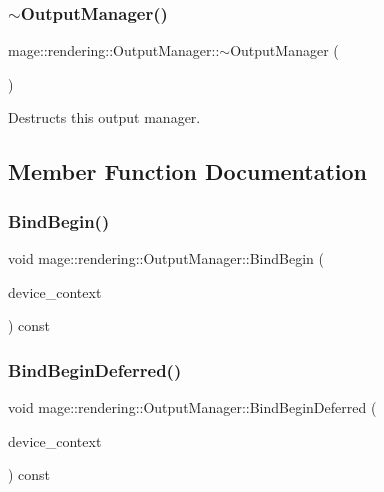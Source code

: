 \subsubsection{\texorpdfstring{$\sim$\+Output\+Manager()}{~OutputManager()}}
{\footnotesize\ttfamily mage\+::rendering\+::\+Output\+Manager\+::$\sim$\+Output\+Manager (\begin{DoxyParamCaption}{ }\end{DoxyParamCaption})\hspace{0.3cm}{\ttfamily [default]}}

Destructs this output manager. 

\subsection{Member Function Documentation}
\hypertarget{classmage_1_1rendering_1_1_output_manager_a9c753354655b7b218263832c343417d1}{}\label{classmage_1_1rendering_1_1_output_manager_a9c753354655b7b218263832c343417d1} 
\subsubsection{\texorpdfstring{Bind\+Begin()}{BindBegin()}}
{\footnotesize\ttfamily void mage\+::rendering\+::\+Output\+Manager\+::\+Bind\+Begin (\begin{DoxyParamCaption}\item[{I\+D3\+D11\+Device\+Context \&}]{device\+\_\+context }\end{DoxyParamCaption}) const\hspace{0.3cm}{\ttfamily [noexcept]}}

\hypertarget{classmage_1_1rendering_1_1_output_manager_ad05f55888d2075806ae7a381031ecdfd}{}\label{classmage_1_1rendering_1_1_output_manager_ad05f55888d2075806ae7a381031ecdfd} 
\subsubsection{\texorpdfstring{Bind\+Begin\+Deferred()}{BindBeginDeferred()}}
{\footnotesize\ttfamily void mage\+::rendering\+::\+Output\+Manager\+::\+Bind\+Begin\+Deferred (\begin{DoxyParamCaption}\item[{I\+D3\+D11\+Device\+Context \&}]{device\+\_\+context }\end{DoxyParamCaption}) const\hspace{0.3cm}{\ttfamily [noexcept]}}


